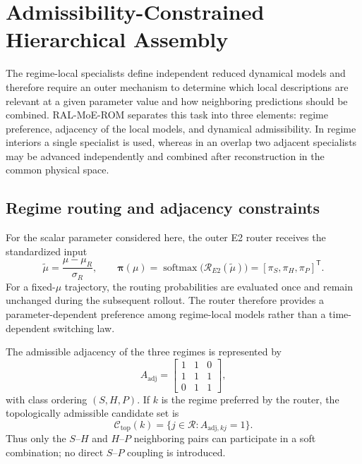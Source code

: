 \section{Admissibility-Constrained Hierarchical Assembly}
\label{sec:hierarchical_ral_moe}

The regime-local specialists define independent reduced dynamical models and
therefore require an outer mechanism to determine which local descriptions
are relevant at a given parameter value and how neighboring predictions
should be combined.  RAL-MoE-ROM separates this task into three elements:
regime preference, adjacency of the local models, and dynamical
admissibility.  In regime interiors a single specialist is used, whereas in
an overlap two adjacent specialists may be advanced independently and
combined after reconstruction in the common physical space.

\subsection{Regime routing and adjacency constraints}
\label{subsec:trajectory_router_topology}

For the scalar parameter considered here, the outer E2 router receives the
standardized input
\begin{equation}
  \widetilde{\mu}
  =
  \frac{\mu-\mu_{R}}{\sigma_{R}},
  \qquad
  \boldsymbol{\pi}(\mu)
  =
  \operatorname{softmax}
  \bigl(\mathcal{R}_{E2}(\widetilde{\mu})\bigr)
  =
  [\pi_S,\pi_H,\pi_P]^{\mathsf T}.
  \label{eq:e2_outer_router}
\end{equation}
For a fixed-$\mu$ trajectory, the routing probabilities are evaluated once
and remain unchanged during the subsequent rollout.  The router therefore
provides a parameter-dependent preference among regime-local models rather
than a time-dependent switching law.

The admissible adjacency of the three regimes is represented by
\begin{equation}
  A_{\mathrm{adj}}
  =
  \begin{bmatrix}
    1&1&0\\
    1&1&1\\
    0&1&1
  \end{bmatrix},
  \label{eq:adjacency_matrix}
\end{equation}
with class ordering $(S,H,P)$.  If $k$ is the regime preferred by the router,
the topologically admissible candidate set is
\begin{equation}
  \mathcal{C}_{\mathrm{top}}(k)
  =
  \{j\in\mathcal{R}:A_{\mathrm{adj},kj}=1\}.
  \label{eq:topological_candidate_set}
\end{equation}
Thus only the $S$--$H$ and $H$--$P$ neighboring pairs can participate in a
soft combination; no direct $S$--$P$ coupling is introduced.

